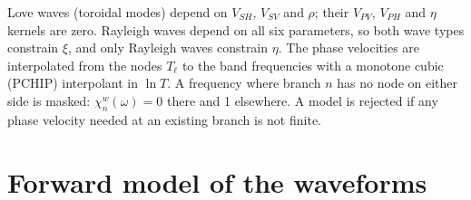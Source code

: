 \documentclass[11pt]{article}
\newcommand{\vsv}{V_{SV}}
\newcommand{\vsh}{V_{SH}}
\newcommand{\vpv}{V_{PV}}
\newcommand{\vph}{V_{PH}}
\begin{document}
Love waves (toroidal modes) depend on $\vsh$, $\vsv$ and $\rho$; their
$\vpv$, $\vph$ and $\eta$ kernels are zero. Rayleigh waves depend on all
six parameters, so both wave types constrain $\xi$, and only Rayleigh waves
constrain $\eta$. The phase velocities are interpolated from the nodes
$T_\ell$ to the band frequencies with a monotone cubic (PCHIP) interpolant
in $\ln T$. A frequency where branch $n$ has no node on either side is
masked: $\chi^w_n(\omega)=0$ there and 1 elsewhere. A model is rejected
if any phase velocity needed at an existing branch is not finite.

\section{Forward model of the waveforms}\label{sec:forward}
\end{document}
